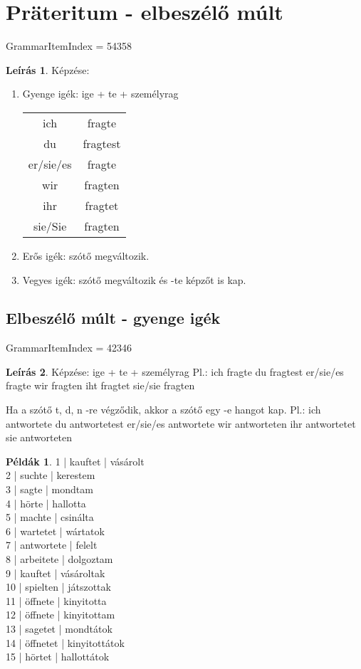 \documentclass{article}
\theoremstyle{definition}
\newtheorem*{exmp}{Példák}
\newtheorem*{desc}{Leírás}
\begin{document}
\section{Präteritum - elbeszélő múlt}

GrammarItemIndex = 54358

\begin{desc}
Képzése:
\begin{enumerate}
\item
Gyenge igék: ige + te + személyrag

\begin{tabular}{cc}
 ich & fragte \\
 du & fragtest \\
 er/sie/es & fragte \\
 wir & fragten \\
 ihr & fragtet \\
 sie/Sie & fragten
\end{tabular}

\item
Erős igék: szótő megváltozik.
\item
Vegyes igék: szótő megváltozik és -te képzőt is kap.
\end{enumerate}
\end{desc}

\subsection{Elbeszélő múlt - gyenge igék}

GrammarItemIndex = 42346

\begin{desc}
Képzése: ige + te + személyrag
Pl.:
ich fragte
du fragtest
er/sie/es fragte
wir fragten
iht fragtet
sie/sie fragten

Ha a szótő t, d, n -re végződik, akkor a szótő egy -e hangot kap.
Pl.:
ich	antwortete
du	antwortetest
er/sie/es	antwortete
wir	antworteten
ihr antwortetet
sie	antworteten
\end{desc}

\begin{exmp}
1 | kauftet | vásárolt\\
2 | suchte | kerestem\\
3 | sagte | mondtam\\
4 | hörte | hallotta\\
5 | machte | csinálta\\
6 | wartetet | wártatok\\
7 | antwortete | felelt\\
8 | arbeitete | dolgoztam\\
9 | kauftet | vásároltak\\
10 | spielten | játszottak\\
11 | öffnete | kinyitotta\\
12 | öffnete | kinyitottam\\
13 | sagetet | mondtátok\\
14 | öffnetet | kinyitottátok\\
15 | hörtet | hallottátok\\
\end{exmp}
\end{document}
